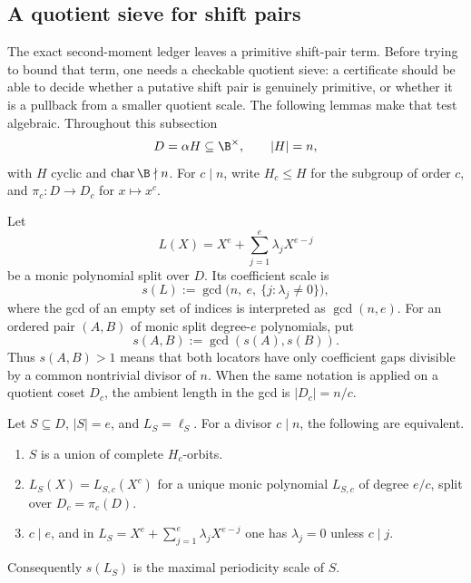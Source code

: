 %

\subsection{A quotient sieve for shift pairs}
\label{subsec:sp-next-quotient-sieve}

The exact second-moment ledger leaves a primitive shift-pair term.  Before
trying to bound that term, one needs a checkable quotient sieve: a certificate
should be able to decide whether a putative shift pair is genuinely primitive,
or whether it is a pullback from a smaller quotient scale.  The following
lemmas make that test algebraic.  Throughout this subsection
\[
        D=\alpha H\subseteq \B^\times,\qquad |H|=n,
\]
with \(H\) cyclic and \(\operatorname{char}\B\nmid n\).  For \(c\mid n\),
write \(H_c\le H\) for the subgroup of order \(c\), and
\(\pi_c:D\to D_c\) for \(x\mapsto x^c\).

\begin{definition}
\label{def:sp-next-coeff-scale}
Let
\[
        L(X)=X^e+\sum_{j=1}^e \lambda_j X^{e-j}
\]
be a monic polynomial split over \(D\).  Its coefficient scale is
\[
        s(L):=\gcd\bigl(n,\ e,\ \{j:\lambda_j\ne0\}\bigr),
\]
where the gcd of an empty set of indices is interpreted as \(\gcd(n,e)\).
For an ordered pair \((A,B)\) of monic split degree-\(e\) polynomials, put
\[
        s(A,B):=\gcd(s(A),s(B)).
\]
Thus \(s(A,B)>1\) means that both locators have only coefficient gaps
divisible by a common nontrivial divisor of \(n\).
When the same notation is applied on a quotient coset \(D_c\), the ambient
length in the gcd is \(|D_c|=n/c\).
\end{definition}

\begin{lemma}
\label{lem:sp-next-periodicity-equivalence}
Let \(S\subseteq D\), \(|S|=e\), and \(L_S=\ell_S\).  For a divisor
\(c\mid n\), the following are equivalent.
\begin{enumerate}
\item \(S\) is a union of complete \(H_c\)-orbits.
\item \(L_S(X)=L_{S,c}(X^c)\) for a unique monic polynomial
      \(L_{S,c}\) of degree \(e/c\), split over \(D_c=\pi_c(D)\).
\item \(c\mid e\), and in
      \(L_S=X^e+\sum_{j=1}^e\lambda_jX^{e-j}\) one has
      \(\lambda_j=0\) unless \(c\mid j\).
\end{enumerate}
Consequently \(s(L_S)\) is the maximal periodicity scale of \(S\).
\end{lemma}

